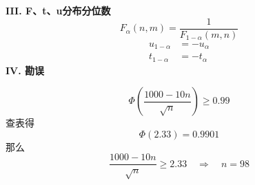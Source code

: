 \documentclass[a4paper]{ctexart}    %
\begin{document}
	\textbf{\large III. F、t、u分布分位数}
	\begin{equation*}
		F_{\alpha} (n, m) = \frac{1}{F_{1-\alpha}(m, n)}
	\end{equation*}
	\begin{equation*}
		\begin{split}
			u_{1-\alpha} &= -u_{\alpha} \\
			t_{1-\alpha} &= -t_{\alpha} 
		\end{split}
	\end{equation*}
	\textbf{\large IV. 勘误}
	\begin{tcolorbox}
		[
		colframe=red!70,
		coltitle=red!10!white, 
		fonttitle=\bfseries, 
		adjusted title=P6 \quad 2.5
		]
		\begin{equation*}
			\Phi\left(\frac{1000 - 10n}{\sqrt{n}}\right) \geq 0.99
		\end{equation*}
		查表得
		\begin{equation*}
			\Phi(2.33) = 0.9901
		\end{equation*}
		那么
		\begin{equation*}
			\frac{1000 - 10n}{\sqrt{n}} \geq 2.33 \quad \Rightarrow \quad n = 98
		\end{equation*}
	\end{tcolorbox}
\end{document}

